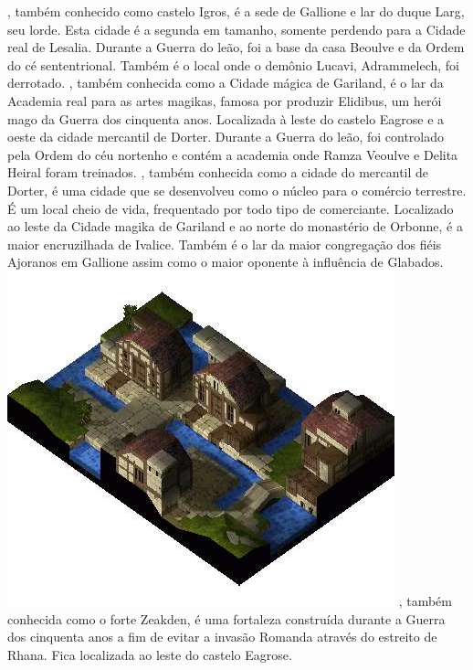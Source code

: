 \vfill
%
, também conhecido como castelo Igros, é a sede de Gallione e lar do duque Larg, seu lorde.
Esta cidade é a segunda em tamanho, somente perdendo para a Cidade real de Lesalia.
Durante a Guerra do leão, foi a base da casa Beoulve e da Ordem do cé sententrional.
Também é o local onde o demônio Lucavi, Adrammelech, foi derrotado.
, também conhecida como a Cidade mágica de Gariland, é o lar da Academia real para as artes magikas, famosa por produzir Elidibus, um herói mago da Guerra dos cinquenta anos.
Localizada à leste do castelo Eagrose e a oeste da cidade mercantil de Dorter.
Durante a Guerra do leão, foi controlado pela Ordem do céu nortenho e contém a academia onde Ramza Veoulve e Delita Heiral foram treinados.
, também conhecida como a cidade do mercantil de Dorter, é uma cidade que se desenvolveu como o núcleo para o comércio terrestre.
É um local cheio de vida, frequentado por todo tipo de comerciante.
Localizado ao leste da Cidade magika de Gariland e ao norte do monastério de Orbonne, é a maior encruzilhada de Ivalice.
Também é o lar da maior congregação dos fiéis Ajoranos em Gallione assim como o maior oponente à influência de Glabados.
%
\newpage
\includegraphics[width=\columnwidth]{./art/worldbook/gariland.jpg}
\vfill
%
, também conhecida como o forte Zeakden, é uma fortaleza construída durante a Guerra dos cinquenta anos a fim de evitar a invasão Romanda através do estreito de Rhana. Fica localizada ao leste do castelo Eagrose.
